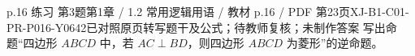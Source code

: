 \par\noindent\begin{minipage}{\linewidth}
\begin{bankitem}{p.16 练习 第3题}{第1章 / 1.2 常用逻辑用语 / 教材 p.16 / PDF 第23页}{XJ-B1-C01-PR-P016-Y0642}{已对照原页转写题干及公式；待教师复核；未制作答案}
写出命题“四边形 $ABCD$ 中，若 $AC\perp BD$，则四边形 $ABCD$ 为菱形”的逆命题。
\end{bankitem}
\end{minipage}\par\medskip
